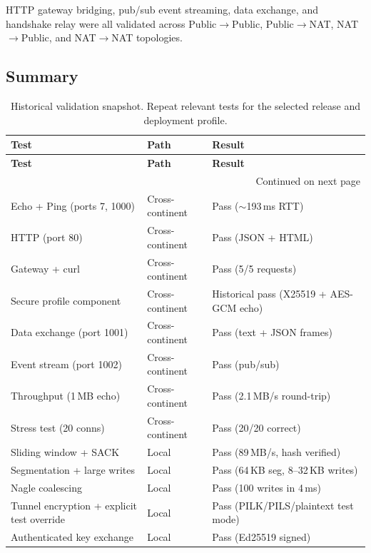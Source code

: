 \documentclass[11pt,a4paper]{article}
\begin{document}
HTTP gateway bridging, pub/sub event streaming, data exchange, and handshake relay were all validated across Public$\rightarrow$Public, Public$\rightarrow$NAT, NAT$\rightarrow$Public, and NAT$\rightarrow$NAT topologies.

\subsection{Summary}

\small
\begin{longtable}{@{}p{}p{}p{}@{}}
\caption{Historical validation snapshot. Repeat relevant tests for the selected release and deployment profile.}\label{tab:results}\\
\toprule
\textbf{Test} & \textbf{Path} & \textbf{Result} \\
\midrule
\endfirsthead
\toprule
\textbf{Test} & \textbf{Path} & \textbf{Result} \\
\midrule
\endhead
\midrule
\multicolumn{3}{r}{\footnotesize Continued on next page}\\
\endfoot
\bottomrule
\endlastfoot
Echo + Ping (ports 7, 1000) & Cross-continent & Pass (${\sim}$193\,ms RTT) \\
HTTP (port 80) & Cross-continent & Pass (JSON + HTML) \\
Gateway + curl & Cross-continent & Pass (5/5 requests) \\
Secure profile component & Cross-continent & Historical pass (X25519 + AES-GCM echo) \\
Data exchange (port 1001) & Cross-continent & Pass (text + JSON frames) \\
Event stream (port 1002) & Cross-continent & Pass (pub/sub) \\
Throughput (1\,MB echo) & Cross-continent & Pass (2.1\,MB/s round-trip) \\
Stress test (20 conns) & Cross-continent & Pass (20/20 correct) \\
\midrule
Sliding window + SACK & Local & Pass (89\,MB/s, hash verified) \\
Segmentation + large writes & Local & Pass (64\,KB seg, 8--32\,KB writes) \\
Nagle coalescing & Local & Pass (100 writes in 4\,ms) \\
Tunnel encryption + explicit test override & Local & Pass (PILK/PILS/plaintext test mode) \\
Authenticated key exchange & Local & Pass (Ed25519 signed) \\

\end{longtable}
\end{document}
